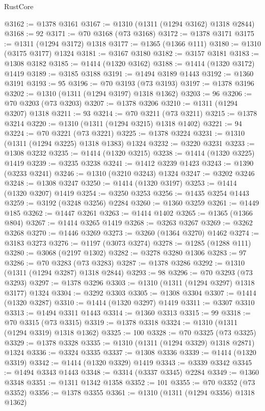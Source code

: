 \begin{lexlean}{RustCore}
\begin{coremodule}
@3162 := @1378 @3161
@3167 := @1310 (@1311 (@1294 @3162) @1318 @2844)
@3168 := 92
@3171 := @70 @3168 (@73 @3168)
@3172 := @1378 @3171
@3175 := @1311 (@1294 @3172) @1318
@3177 := @1365 (@1366 @111)
@3180 := @1310 (@3175 @3177) @1324
@3181 := @3167 @3180
@3182 := @3157 @3181
@3183 := @1308 @3182
@3185 := @1414 (@1320 @3162)
@3188 := @1414 (@1320 @3172) @1419
@3189 := @3185 @3188
@3191 := @1494 @3189 @1443
@3192 := @1360 @3191
@3193 := 95
@3196 := @70 @3193 (@73 @3193)
@3197 := @1378 @3196
@3202 := @1310 (@1311 (@1294 @3197) @1318 @1362)
@3203 := 96
@3206 := @70 @3203 (@73 @3203)
@3207 := @1378 @3206
@3210 := @1311 (@1294 @3207) @1318
@3211 := 93
@3214 := @70 @3211 (@73 @3211)
@3215 := @1378 @3214
@3220 := @1310 (@1311 (@1294 @3215) @1318 @1402)
@3221 := 94
@3224 := @70 @3221 (@73 @3221)
@3225 := @1378 @3224
@3231 := @1310 (@1311 (@1294 @3225) @1318 @1383) @1324
@3232 := @3220 @3231
@3233 := @1308 @3232
@3235 := @1414 (@1320 @3215)
@3238 := @1414 (@1320 @3225) @1419
@3239 := @3235 @3238
@3241 := @1412 @3239 @1423
@3243 := @1390 (@3233 @3241)
@3246 := @1310 (@3210 @3243) @1324
@3247 := @3202 @3246
@3248 := @1308 @3247
@3250 := @1414 (@1320 @3197)
@3253 := @1414 (@1320 @3207) @1419
@3254 := @3250 @3253
@3256 := @1435 @3254 @1443
@3259 := @3192 (@3248 @3256) @2284
@3260 := @1360 @3259
@3261 := @1449 @185
@3262 := @1447 @3261
@3263 := @1414 @1402
@3265 := @1365 (@1366 @804)
@3267 := @1414 @3265 @1419
@3268 := @3263 @3267
@3269 := @3262 @3268
@3270 := @1446 @3269
@3273 := @3260 (@1364 @3270) @1462
@3274 := @3183 @3273
@3276 := @1197 (@3073 @3274)
@3278 := @1285 (@1288 @111)
@3280 := @3068 (@2197 @1302)
@3282 := @3278 @3280 @1306
@3283 := 97
@3286 := @70 @3283 (@73 @3283)
@3287 := @1378 @3286
@3292 := @1310 (@1311 (@1294 @3287) @1318 @2844)
@3293 := 98
@3296 := @70 @3293 (@73 @3293)
@3297 := @1378 @3296
@3303 := @1310 (@1311 (@1294 @3297) @1318 @3177) @1324
@3304 := @3292 @3303
@3305 := @1308 @3304
@3307 := @1414 (@1320 @3287)
@3310 := @1414 (@1320 @3297) @1419
@3311 := @3307 @3310
@3313 := @1494 @3311 @1443
@3314 := @1360 @3313
@3315 := 99
@3318 := @70 @3315 (@73 @3315)
@3319 := @1378 @3318
@3324 := @1310 (@1311 (@1294 @3319) @1318 @1362)
@3325 := 100
@3328 := @70 @3325 (@73 @3325)
@3329 := @1378 @3328
@3335 := @1310 (@1311 (@1294 @3329) @1318 @2871) @1324
@3336 := @3324 @3335
@3337 := @1308 @3336
@3339 := @1414 (@1320 @3319)
@3342 := @1414 (@1320 @3329) @1419
@3343 := @3339 @3342
@3345 := @1494 @3343 @1443
@3348 := @3314 (@3337 @3345) @2284
@3349 := @1360 @3348
@3351 := @1311 @1342 @1358
@3352 := 101
@3355 := @70 @3352 (@73 @3352)
@3356 := @1378 @3355
@3361 := @1310 (@1311 (@1294 @3356) @1318 @1362)

\end{coremodule}
\end{lexlean}
